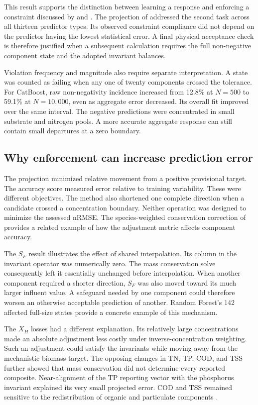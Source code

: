 This result supports the distinction between learning a response and enforcing a constraint discussed by \citet{Kashinath2021} and \citet{Hansen2024}. The projection of \citet{KircherVotsmeier2025} addressed the second task across all thirteen predictor types. Its observed constraint compliance did not depend on the predictor having the lowest statistical error. A final physical acceptance check is therefore justified when a subsequent calculation requires the full non-negative component state and the adopted invariant balances.

Violation frequency and magnitude also require separate interpretation. A state was counted as failing when any one of twenty components crossed the tolerance. For CatBoost, raw non-negativity incidence increased from 12.8\% at $N=500$ to 59.1\% at $N=10{,}000$, even as aggregate error decreased. Its overall fit improved over the same interval. The negative predictions were concentrated in small substrate and nitrogen pools. A more accurate aggregate response can still contain small departures at a zero boundary.

\subsection{Why enforcement can increase prediction error}

The projection minimized relative movement from a positive provisional target. The accuracy score measured error relative to training variability. These were different objectives. The method also shortened one complete direction when a candidate crossed a concentration boundary. Neither operation was designed to minimize the assessed nRMSE. The species-weighted conservation correction of \citet{SturmSilva2024} provides a related example of how the adjustment metric affects component accuracy.

The $S_F$ result illustrates the effect of shared interpolation. Its column in the invariant operator was numerically zero. The mass conservation solve consequently left it essentially unchanged before interpolation. When another component required a shorter direction, $S_F$ was also moved toward its much larger influent value. A safeguard needed by one component could therefore worsen an otherwise acceptable prediction of another. Random Forest's 142 affected full-size states provide a concrete example of this mechanism.

The $X_H$ losses had a different explanation. Its relatively large concentrations made an absolute adjustment less costly under inverse-concentration weighting. Such an adjustment could satisfy the invariants while moving away from the mechanistic biomass target. The opposing changes in TN, TP, COD, and TSS further showed that mass conservation did not determine every reported composite. Near-alignment of the TP reporting vector with the phosphorus invariant explained its very small projected error. COD and TSS remained sensitive to the redistribution of organic and particulate components \citep{Henze2006}.


